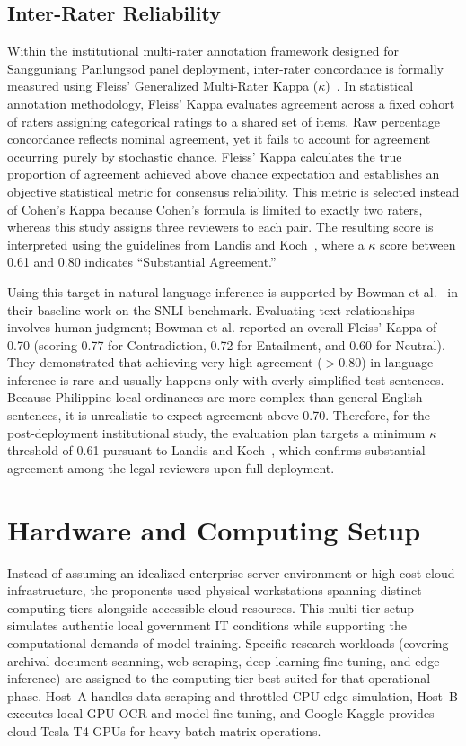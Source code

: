     \subsection{Inter-Rater Reliability}
    \label{sec:inter_rater_reliability}
    Within the institutional multi-rater annotation framework designed for Sangguniang Panlungsod panel deployment, inter-rater concordance is formally measured using Fleiss' Generalized Multi-Rater Kappa ($\kappa$)~\cite{fleiss1971measuring}. In statistical annotation methodology, Fleiss' Kappa evaluates agreement across a fixed cohort of raters assigning categorical ratings to a shared set of items. Raw percentage concordance reflects nominal agreement, yet it fails to account for agreement occurring purely by stochastic chance. Fleiss' Kappa calculates the true proportion of agreement achieved above chance expectation and establishes an objective statistical metric for consensus reliability. This metric is selected instead of Cohen's Kappa because Cohen's formula is limited to exactly two raters, whereas this study assigns three reviewers to each pair. The resulting score is interpreted using the guidelines from Landis and Koch~\cite{landis1977measurement}, where a $\kappa$ score between 0.61 and 0.80 indicates ``Substantial Agreement.''

    Using this target in natural language inference is supported by Bowman et al.~\cite{bowman2015snli} in their baseline work on the SNLI benchmark. Evaluating text relationships involves human judgment; Bowman et al. reported an overall Fleiss' Kappa of 0.70 (scoring 0.77 for Contradiction, 0.72 for Entailment, and 0.60 for Neutral). They demonstrated that achieving very high agreement ($> 0.80$) in language inference is rare and usually happens only with overly simplified test sentences. Because Philippine local ordinances are more complex than general English sentences, it is unrealistic to expect agreement above 0.70. Therefore, for the post-deployment institutional study, the evaluation plan targets a minimum $\kappa$ threshold of 0.61 pursuant to Landis and Koch~\cite{landis1977measurement}, which confirms substantial agreement among the legal reviewers upon full deployment.

    \section{Hardware and Computing Setup}
    \label{sec:hardware_software_environments}
    Instead of assuming an idealized enterprise server environment or high-cost cloud infrastructure, the proponents used physical workstations spanning distinct computing tiers alongside accessible cloud resources. This multi-tier setup simulates authentic local government IT conditions while supporting the computational demands of model training. Specific research workloads (covering archival document scanning, web scraping, deep learning fine-tuning, and edge inference) are assigned to the computing tier best suited for that operational phase. Host~A handles data scraping and throttled CPU edge simulation, Host~B executes local GPU OCR and model fine-tuning, and Google Kaggle provides cloud Tesla T4 GPUs for heavy batch matrix operations.

